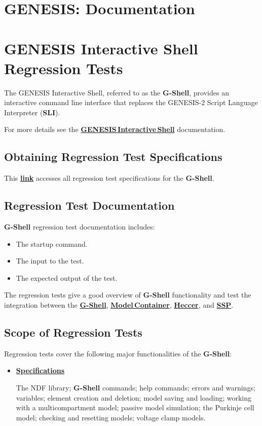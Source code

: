 \documentclass[12pt]{article}
\begin{document}
\section*{GENESIS: Documentation}

\section*{GENESIS Interactive Shell Regression Tests}

The GENESIS Interactive Shell, referred to as the {\bf G-Shell}, provides an interactive command line interface that replaces the GENESIS-2 Script Language Interpreter ({\bf SLI}).

For more details see the \href{../gshell/gshell.tex}{\bf GENESIS\,Interactive\,Shell} documentation.

\subsection*{Obtaining Regression Test Specifications}

This \href{http://neurospaces.sourceforge.net/neurospaces_project/gshell/tests/html/specifications/main.html}{\bf link} accesses all regression test specifications for the {\bf G-Shell}.

\subsection*{Regression Test Documentation}

{\bf G-Shell} regression test documentation includes:
\begin{itemize}
\item The startup command.
\item The input to the test.
\item The expected output of the test.
\end{itemize}
The regression tests give a good overview of {\bf G-Shell} functionality and test the integration between the \href{../gshell/gshell.tex}{{\bf G-Shell}}, \href{../model-container/model-container.tex}{\bf Model\,Container}, \href{../heccer/heccer.tex}{\bf Heccer}, and \href{../ssp/ssp.tex}{\bf SSP}.

\subsection*{Scope of Regression Tests}

Regression tests cover the following major functionalities of the {\bf G-Shell}:
\begin{itemize}
\item[]\href{http://neurospaces.sourceforge.net/neurospaces_project/gshell/tests/html/index.html}{\bf Specifications}

The NDF library; {\bf G-Shell} commands; help commands; errors and warnings; variables; element creation and deletion; model saving and loading; working with a multicompartment model; passive model simulation; the Purkinje cell model; checking and resetting models; voltage clamp models.

\end{itemize}
\end{document}
